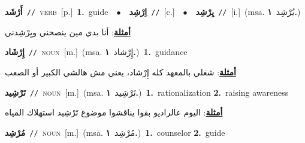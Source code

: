\documentclass[10pt,a4paper,twoside]{article} %
\begin{document}
\begin{multicols}{2}
{\setlength\topsep{0pt}\textbf{\foreignlanguage{arabic}{أَرْشَد}}\ {\color{gray}\texttt{//}\color{black}}\ \textsc{verb}\ [p.]\ \textbf{1.}~guide\ \ $\bullet$\ \ \setlength\topsep{0pt}\textbf{\foreignlanguage{arabic}{اِرْشِد}}\ {\color{gray}\texttt{//}\color{black}}\ [c.]\ \ $\bullet$\ \ \setlength\topsep{0pt}\textbf{\foreignlanguage{arabic}{يِرْشِد}}\ {\color{gray}\texttt{//}\color{black}}\ [i.]\ \color{gray}(msa. \foreignlanguage{arabic}{يُرْشِد}~\foreignlanguage{arabic}{\textbf{١.}})\color{black}\  \begin{flushright}\color{gray}\foreignlanguage{arabic}{\textbf{\underline{\foreignlanguage{arabic}{أمثلة}}}: أنا بدي مين ينصحني ويِرْشِدني}\end{flushright}\color{black}} \vspace{2mm}

{\setlength\topsep{0pt}\textbf{\foreignlanguage{arabic}{إِرْشَاد}}\ {\color{gray}\texttt{//}\color{black}}\ \textsc{noun}\ [m.]\ \color{gray}(msa. \foreignlanguage{arabic}{إِرْشاد}~\foreignlanguage{arabic}{\textbf{١.}})\color{black}\ \textbf{1.}~guidance\  \begin{flushright}\color{gray}\foreignlanguage{arabic}{\textbf{\underline{\foreignlanguage{arabic}{أمثلة}}}: شغلي بالمعهد كله إِرْشاد، يعني مش هالشي الكبير أو الصعب}\end{flushright}\color{black}} \vspace{2mm}

{\setlength\topsep{0pt}\textbf{\foreignlanguage{arabic}{تَرْشِيد}}\ {\color{gray}\texttt{//}\color{black}}\ \textsc{noun}\ [m.]\ \color{gray}(msa. \foreignlanguage{arabic}{تَرْشِيد}~\foreignlanguage{arabic}{\textbf{١.}})\color{black}\ \textbf{1.}~rationalization  \textbf{2.}~raising awareness\  \begin{flushright}\color{gray}\foreignlanguage{arabic}{\textbf{\underline{\foreignlanguage{arabic}{أمثلة}}}: اليوم عالراديو بقوا يناقشوا موضوع تَرْشِيد استهلاك المياه}\end{flushright}\color{black}} \vspace{2mm}

{\setlength\topsep{0pt}\textbf{\foreignlanguage{arabic}{مُرْشِد}}\ {\color{gray}\texttt{//}\color{black}}\ \textsc{noun}\ [m.]\ \color{gray}(msa. \foreignlanguage{arabic}{مُرْشِد}~\foreignlanguage{arabic}{\textbf{١.}})\color{black}\ \textbf{1.}~counselor  \textbf{2.}~guide\ } \vspace{2mm}


\end{multicols}
\end{document}
